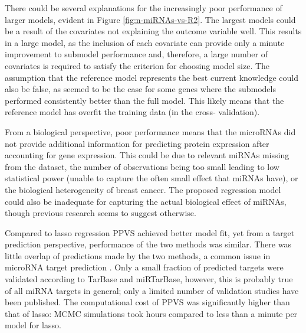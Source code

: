 There could be several explanations for the increasingly poor performance of
larger models, evident in Figure \ref{fig:n-miRNAs-vs-R2}. The largest models
could be a result of the covariates not explaining the outcome variable well.
This results in a large model, as the inclusion of each covariate can provide
only a minute improvement to submodel performance and, therefore, a large
number of covariates is required to satisfy the criterion for choosing model
size. The assumption that the reference model represents the best current knowledge
could also be false, as seemed to be the case for some genes where the
submodels performed consistently better than the full model. This likely means
that the reference model has overfit the training data (in the cross-
validation).

From a biological perspective, poor performance means that the microRNAs did
not provide additional information for predicting protein expression after
accounting for gene expression. This could be due to relevant miRNAs missing
from the dataset, the number of observations being too small leading to low
statistical power (unable to capture the often small effect that miRNAs have),
or the biological heterogeneity of breast cancer.
The proposed regression model could also be inadequate for capturing the actual	
biological effect of miRNAs, though previous research seems to suggest otherwise.



Compared to lasso regression PPVS achieved better model fit, yet from a target
prediction perspective, performance of the two methods was similar. There
was little overlap of predictions made by the two methods, a common issue in
microRNA target prediction \citep{vanIterson2013}. Only a small fraction of
predicted targets were validated according to TarBase and miRTarBase, however,
this is probably true of all miRNA targets in general; only a
limited number of validation studies have been published. The computational cost
of PPVS was significantly higher than that of lasso: MCMC simulations took hours
compared to less than a minute per model for lasso.

